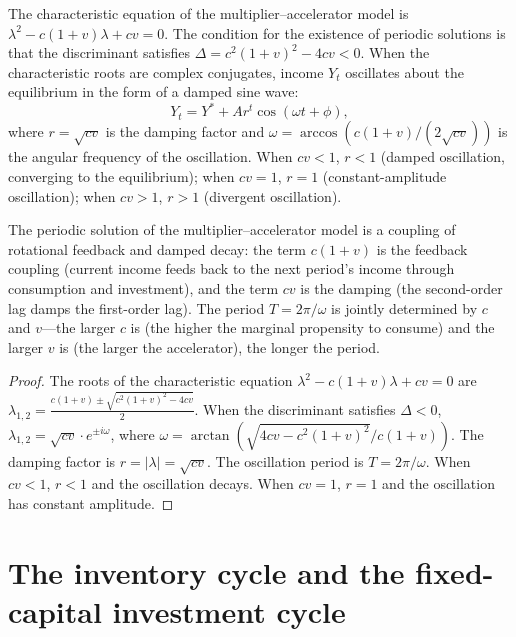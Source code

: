 \begin{proposition}\label{prop:mult_acc_periodic}
The characteristic equation of the multiplier--accelerator model is $\lambda^2 - c(1+v)\lambda + cv = 0$. The condition for the existence of periodic solutions is that the discriminant satisfies $\Delta = c^2(1+v)^2 - 4cv < 0$. When the characteristic roots are complex conjugates, income $Y_t$ oscillates about the equilibrium in the form of a damped sine wave:
\[
Y_t = Y^* + Ar^t\cos(\omega t + \phi),
\]
where $r = \sqrt{cv}$ is the damping factor and $\omega = \arccos(c(1+v)/(2\sqrt{cv}))$ is the angular frequency of the oscillation. When $cv < 1$, $r < 1$ (damped oscillation, converging to the equilibrium); when $cv = 1$, $r = 1$ (constant-amplitude oscillation); when $cv > 1$, $r > 1$ (divergent oscillation).

The periodic solution of the multiplier--accelerator model is a coupling of rotational feedback and damped decay: the term $c(1+v)$ is the feedback coupling (current income feeds back to the next period's income through consumption and investment), and the term $cv$ is the damping (the second-order lag damps the first-order lag). The period $T = 2\pi/\omega$ is jointly determined by $c$ and $v$---the larger $c$ is (the higher the marginal propensity to consume) and the larger $v$ is (the larger the accelerator), the longer the period.
\end{proposition}

\begin{proof}
The roots of the characteristic equation $\lambda^2 - c(1+v)\lambda + cv = 0$ are $\lambda_{1,2} = \frac{c(1+v) \pm \sqrt{c^2(1+v)^2 - 4cv}}{2}$. When the discriminant satisfies $\Delta < 0$, $\lambda_{1,2} = \sqrt{cv} \cdot e^{\pm i\omega}$, where $\omega = \arctan(\sqrt{4cv - c^2(1+v)^2} / c(1+v))$. The damping factor is $r = |\lambda| = \sqrt{cv}$. The oscillation period is $T = 2\pi/\omega$. When $cv < 1$, $r < 1$ and the oscillation decays. When $cv = 1$, $r = 1$ and the oscillation has constant amplitude.
\end{proof}

\section{The inventory cycle and the fixed-capital investment cycle}

